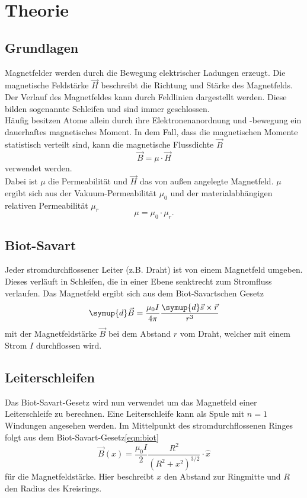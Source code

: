 \section{Theorie}
\label{sec:Theorie}

\subsection{Grundlagen}
Magnetfelder werden durch die Bewegung elektrischer Ladungen erzeugt.
Die magnetische Feldstärke $\vec{H}$ beschreibt die Richtung und Stärke des Magnetfelds.
Der Verlauf des Magnetfeldes kann durch Feldlinien dargestellt werden.
Diese bilden sogenannte Schleifen und sind immer geschlossen.\\
Häufig besitzen Atome allein durch ihre Elektronenanordnung und -bewegung ein dauerhaftes magnetisches Moment.
In dem Fall, dass die magnetischen Momente statistisch verteilt sind, kann die magnetische Flussdichte $\vec{B}$
\begin{equation}
    \vec{B} = \mu \cdot \vec{H}
    \label{eqn:h_zu_b}
\end{equation}
verwendet werden.\\
Dabei ist $\mu$ die Permeabilität und $\vec{H}$ das von außen angelegte Magnetfeld.
$\mu$ ergibt sich aus der Vakuum-Permeabilität $\mu_0$ und der materialabhängigen relativen Permeabilität $\mu_r$
\begin{equation*}
    \mu = \mu_0 \cdot \mu_r .
\end{equation*}

\subsection{Biot-Savart}
Jeder stromdurchflossener Leiter (z.B. Draht) ist von einem Magnetfeld umgeben. Dieses verläuft in Schleifen, die in einer Ebene
senktrecht zum Stromfluss verlaufen. Das Magnetfeld ergibt sich aus dem Biot-Savartschen Gesetz
\begin{equation}
    \symup{d}\vec{B} = \frac{\mu_0 I}{4\pi} \frac{\symup{d}\vec{s} \times \vec{r}}{r^3}
    \label{eqn:biot}
\end{equation}
mit der Magnetfeldstärke $\vec{B}$ bei dem Abstand $r$ vom Draht, welcher mit einem Strom $I$ durchflossen wird.

\subsection{Leiterschleifen}
Das Biot-Savart-Gesetz wird nun verwendet um das Magnetfeld einer Leiterschleife zu berechnen. Eine Leiterschleife
kann als Spule mit $n=1$ Windungen angesehen werden. Im Mittelpunkt des stromdurchflossenen Ringes folgt aus dem Biot-Savart-Gesetz\eqref{eqn:biot}
\begin{equation}
    \vec{B}(x) = \frac{\mu_0 I}{2} \frac{R^2}{(R^2+x^2)^{3/2}} \cdot \hat{x}
\end{equation}
für die Magnetfeldstärke. Hier beschreibt $x$ den Abstand zur Ringmitte und $R$ den Radius des Kreisrings.  \\

